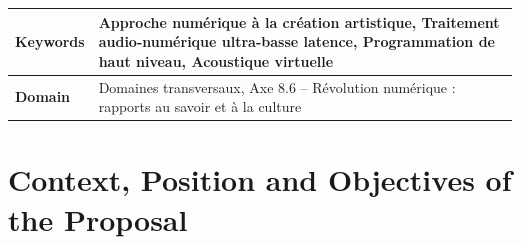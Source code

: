\documentclass[a4paper,10pt]{article}
\author{Coordinator: Romain Michon\\
\small GRAME-CNCM, Lyon.
}
\title{\vspace{-\baselineskip}\mytitle}
\date{Domaines transversaux\\
Axe 8.6. Révolution numérique : rapports au savoir et à la culture}
\begin{document}
\maketitle
\thispagestyle{fancy}



\begin{tabular}{p{2.3cm} p{12.5cm}}
  \hline
  \textbf{Keywords} & Approche numérique à la création artistique, Traitement audio-numérique ultra-basse latence, Programmation de haut niveau, Acoustique virtuelle\\\hline
  \textbf{Domain} & Domaines transversaux, Axe 8.6 -- Révolution numérique : rapports au savoir et à la culture \\\hline
\end{tabular}

\section*{Context, Position and Objectives of the Proposal}


%
\end{document}
